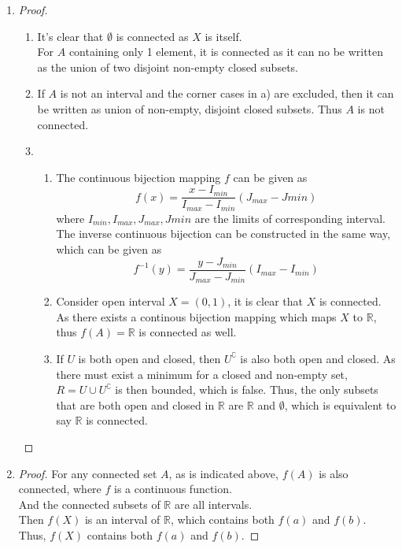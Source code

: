\documentclass[paper=a4, fontsize=11pt]{scrartcl} %
\numberwithin{equation}{section} %
\numberwithin{figure}{section} %
\numberwithin{table}{section} %
\begin{document}
\begin{enumerate}
	\item
	  \begin{proof}
		\begin{enumerate}
			\item
				It's clear that $\emptyset$ is connected as $X$ is itself.\\
				For $A$ containing only 1 element, it is connected as it can no be written as the union of two disjoint non-empty closed subsets.
			\item
				If $A$ is not an interval and the corner cases in a) are excluded, then it can be written as union of non-empty, disjoint closed subsets. Thus $A$ is not connected.
			\item
				\begin{enumerate}
					\item 
						The continuous bijection mapping $f$ can be given as 
						\begin{equation}
							f(x) = \frac{x-I_{min}}{I_{max} - I_{min}} (J_{max} - J{min})
						\end{equation} 
						where $I_{min}, I_{max}, J_{max}, J{min}$ are the limits of corresponding interval.\\
						The inverse continuous bijection can be constructed in the same way, which can be given as
						\begin{equation}
							f^{-1}(y) = \frac{y-J_{min}}{J_{max} - J_{min}} (I_{max} - I_{min})
						\end{equation}
					\item 
						Consider open interval $X = (0, 1)$, it is clear that $X$ is connected. As there exists a continous bijection mapping which maps $X$ to $\mathbb{R}$, thus $f(A) = \mathbb{R}$ is connected as well.
					\item 
						If $U$ is both open and closed, then $U^\complement$ is also both open and closed. As there must exist a minimum for a closed and non-empty set, $R = U \cup U^\complement$ is then bounded, which is false. Thus, the only subsets that are both open and closed in $\mathbb{R}$ are $\mathbb{R}$ and $\emptyset$, which is equivalent to say $\mathbb{R}$ is connected. 
				\end{enumerate}
		\end{enumerate}
	  \end{proof}
	\item 
		\begin{proof}
			For any connected set $A$, as is indicated above, $f(A)$ is also connected, where $f$ is a continuous function.\\
			And the connected subsets of $\mathbb{R}$ are all intervals.\\
			Then $f(X)$ is an interval of $\mathbb{R}$, which contains both $f(a)$ and $f(b)$.\\
			Thus, $f(X)$ contains both $f(a)$ and $f(b)$.
		\end{proof}
\end{enumerate}
\end{document}
